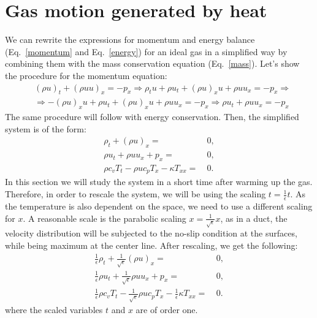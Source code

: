 \documentclass{article}
\begin{document}
\section{Gas motion generated by heat}
We can rewrite the expressions for momentum and energy balance (Eq.~\ref{momentum} and Eq.~\ref{energy}) for an ideal gas in a simplified way by combining them with the mass conservation equation (Eq.~\ref{mass}). Let's show the procedure for the momentum equation:
\begin{align}
&(\rho u)_t  + (\rho u u)_x=-p_x\Rightarrow \rho_t u + \rho u_t + (\rho u)_xu+\rho u u_x =-p_x\Rightarrow \nonumber\\
&\Rightarrow - (\rho u)_xu + \rho u_t + (\rho u)_xu+\rho u u_x =-p_x\Rightarrow \rho u_t+\rho u u_x =-p_x
\end{align}
The same procedure will follow with energy conservation. Then, the simplified system is of the form:
\begin{align}
\label{eq:simple_mass}
\rho_t + (\rho u)_{x} =&\ 0,\\
\label{eq:simple_mom}
\rho u_t + \rho u u_x + p_{x} =&\ 0,\\
\label{eq:simple_energ}
\rho c_v T_t - \rho u c_p T_x - \kappa T_{xx} =&\ 0 .
\end{align}
In this section we will study the system in a short time after warming up the gas. Therefore, in order to rescale the system, we will be using the scaling $t=\frac{1}{\epsilon}t$. As the temperature is also dependent on the space, we need to use a different scaling for $x$. A reasonable scale is the parabolic scaling $x=\frac{1}{\sqrt{\epsilon}}x$, as in a duct, the velocity distribution will be subjected to the no-slip condition at the surfaces, while being maximum at the center line. After rescaling, we get the following: 
\begin{align}
\label{eq:scaled_mass}
\frac{1}{\epsilon}\rho_t + \frac{1}{\sqrt{\epsilon}}(\rho u)_{x} =&\ 0,\\
\label{eq:scaled_mom}
\frac{1}{\epsilon}\rho u_t + \frac{1}{\sqrt{\epsilon}}\rho u u_x + p_{x} =&\ 0,\\
\label{eq:scaled_energ}
\frac{1}{\epsilon}\rho c_v T_t - \frac{1}{\sqrt{\epsilon}} \rho u c_p T_x - \frac{1}{\epsilon}\kappa T_{xx} =&\ 0 .
\end{align}
where the scaled variables $t$ and $x$ are of order one.
\end{document}
